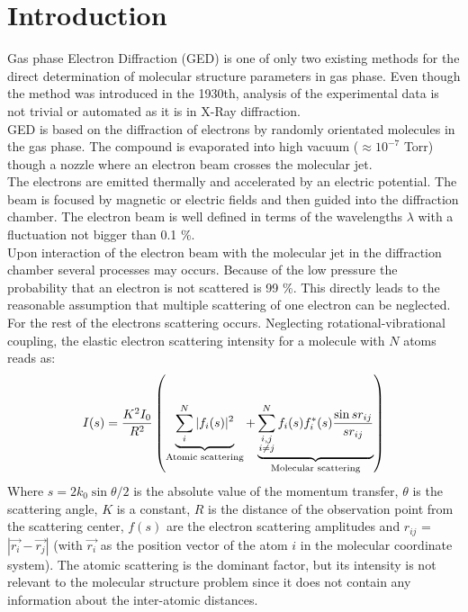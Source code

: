 \section{Introduction}
Gas phase Electron Diffraction  (GED) is one of only two existing methods for the direct determination of molecular structure parameters in gas phase. Even though the method  was introduced in the 1930th, analysis of the experimental data is not trivial or automated as it is in X-Ray diffraction.\\ 
GED is based on the diffraction of electrons by randomly orientated molecules in the gas phase. The compound is evaporated into high vacuum ($\approx 10^{-7}$ Torr) though a nozzle where an electron beam crosses the molecular jet.\\
The electrons are emitted thermally and accelerated by an electric potential.  The beam is focused by magnetic or electric fields and then guided into the diffraction chamber. The electron beam is well defined in terms of the wavelengths $\lambda$ with a fluctuation not bigger than 0.1 \%. \\
Upon interaction of the electron beam with the molecular jet in the diffraction chamber  several processes may occurs. Because of the low pressure the probability that an electron is not scattered is 99 \%. This directly leads to the reasonable assumption that multiple scattering of one electron can be neglected. \\
For the rest of the electrons scattering occurs.  Neglecting rotational-vibrational coupling, the elastic electron scattering intensity for a molecule with $N$ atoms reads as: 
\begin{equation*}
I(s) = \frac{K^2I_0}{R^2}\left(  \underbrace{\sum_i^N |f_i(s)|^2}_{\textnormal{Atomic scattering}} +  \underbrace{\sum^N_{ \substack{i,j \\ i\neq j}}f_i(s)f_i^*(s) \frac{\sin sr_{ij}}{sr_{ij}}}_{\textnormal{Molecular scattering}} \right)
\end{equation*}
Where $s = 2 k_0 \sin \theta/2$ is the absolute value of the momentum transfer, $\theta$ is the scattering angle, $K$ is a constant, $R$ is the distance of the observation point from the scattering center, $f(s)$ are the electron scattering amplitudes and $r_{ij}$ = $|\vec{r_i}-\vec{r_j}|$ (with $\vec{r_i}$ as the position vector of the atom $i$ in the molecular coordinate system). The atomic scattering is the dominant factor, but its intensity is not relevant to the molecular structure problem since it does not contain any information about the inter-atomic distances.  \\
